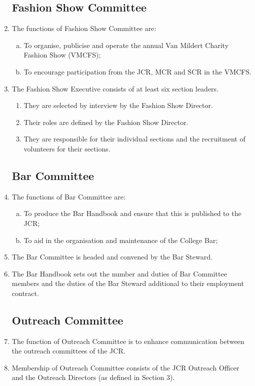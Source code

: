 \documentclass[12pt]{article}  %
\begin{document}
\begin{enumerate}
	\subsection{Fashion Show Committee}
	\item The functions of Fashion Show Committee are:
	\begin{enumerate}[(a)]
		\item To organise, publicise and operate the annual Van Mildert Charity Fashion Show (VMCFS);
		\item To encourage participation from the JCR, MCR and SCR in the VMCFS.
	\end{enumerate}
	\item The Fashion Show Executive consists of at least six section leaders.
	\begin{enumerate}
		\item They are selected by interview by the Fashion Show Director.
		\item Their roles are defined by the Fashion Show Director.
		\item They are responsible for their individual sections and the recruitment of volunteers for their sections.
	\end{enumerate}
	\subsection{Bar Committee}
	\item The functions of Bar Committee are:
	\begin{enumerate}[(a)]
		\item To produce the Bar Handbook and ensure that this is published to the JCR;
		\item To aid in the organisation and maintenance of the College Bar;
	\end{enumerate}
	\item The Bar Committee is headed and convened by the Bar Steward.
	\item The Bar Handbook sets out the number and duties of Bar Committee members and the duties of the Bar Steward additional to their employment contract.
	\subsection{Outreach Committee}
	\item The function of Outreach Committee is to enhance communication between the outreach committees of the JCR.
	\item Membership of Outreach Committee consists of the JCR Outreach Officer and the Outreach Directors (as defined in Section 3). 

\end{enumerate}
\end{document}
